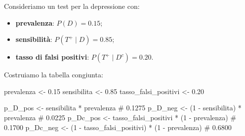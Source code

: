\documentclass[
  italian,
  letterpaper,
  a4paper,
  11pt,
  open=any]{scrbook}
\newenvironment{Shaded}{\begin{snugshade}}{\end{snugshade}}
\newcommand{\CommentTok}[1]{\textcolor[rgb]{0.37,0.37,0.37}{#1}}
\newcommand{\DecValTok}[1]{\textcolor[rgb]{0.68,0.00,0.00}{#1}}
\newcommand{\FloatTok}[1]{\textcolor[rgb]{0.68,0.00,0.00}{#1}}
\newcommand{\NormalTok}[1]{\textcolor[rgb]{0.00,0.23,0.31}{#1}}
\newcommand{\OtherTok}[1]{\textcolor[rgb]{0.00,0.23,0.31}{#1}}
\newcommand{\SpecialCharTok}[1]{\textcolor[rgb]{0.37,0.37,0.37}{#1}}
\providecommand{\tightlist}{%
  \setlength{\itemsep}{0pt}\setlength{\parskip}{0pt}}
\theoremstyle{plain}
\theoremstyle{definition}
\theoremstyle{definition}
\theoremstyle{remark}
\begin{document}
\begin{tcolorbox}[enhanced jigsaw, arc=.35mm, bottomrule=.15mm, bottomtitle=1mm, breakable, colback=white, colbacktitle=quarto-callout-note-color!10!white, colframe=quarto-callout-note-color-frame, coltitle=black, left=2mm, leftrule=.75mm, opacityback=0, opacitybacktitle=0.6, rightrule=.15mm, title=\textcolor{quarto-callout-note-color}{\faInfo}\hspace{0.5em}{Esempio: test diagnostico per la depressione}, titlerule=0mm, toprule=.15mm, toptitle=1mm]

Consideriamo un test per la depressione con:

\begin{itemize}
\tightlist
\item
  \textbf{prevalenza}: \(P(D) = 0.15\);
\item
  \textbf{sensibilità}: \(P(T^+ \mid D) = 0.85\);
\item
  \textbf{tasso di falsi positivi}: \(P(T^+ \mid D^c) = 0.20\).
\end{itemize}

Costruiamo la tabella congiunta:

\begin{Shaded}
\begin{Highlighting}[]
\NormalTok{prevalenza }\OtherTok{\textless{}{-}} \FloatTok{0.15}
\NormalTok{sensibilita }\OtherTok{\textless{}{-}} \FloatTok{0.85}
\NormalTok{tasso\_falsi\_positivi }\OtherTok{\textless{}{-}} \FloatTok{0.20}

\NormalTok{p\_D\_pos }\OtherTok{\textless{}{-}}\NormalTok{ sensibilita }\SpecialCharTok{*}\NormalTok{ prevalenza          }\CommentTok{\# 0.1275}
\NormalTok{p\_D\_neg }\OtherTok{\textless{}{-}}\NormalTok{ (}\DecValTok{1} \SpecialCharTok{{-}}\NormalTok{ sensibilita) }\SpecialCharTok{*}\NormalTok{ prevalenza    }\CommentTok{\# 0.0225}
\NormalTok{p\_Dc\_pos }\OtherTok{\textless{}{-}}\NormalTok{ tasso\_falsi\_positivi }\SpecialCharTok{*}\NormalTok{ (}\DecValTok{1} \SpecialCharTok{{-}}\NormalTok{ prevalenza)   }\CommentTok{\# 0.1700}
\NormalTok{p\_Dc\_neg }\OtherTok{\textless{}{-}}\NormalTok{ (}\DecValTok{1} \SpecialCharTok{{-}}\NormalTok{ tasso\_falsi\_positivi) }\SpecialCharTok{*}\NormalTok{ (}\DecValTok{1} \SpecialCharTok{{-}}\NormalTok{ prevalenza) }\CommentTok{\# 0.6800}


\end{Highlighting}
\end{Shaded}
\end{tcolorbox}
\end{document}
